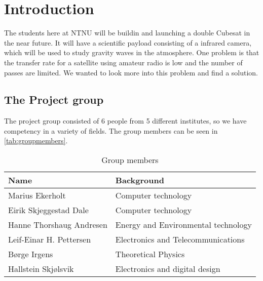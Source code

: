 \chapter{Introduction}
\label{chap:introduction}

The students here at NTNU will be buildin and launching a double Cubesat in the near future. It will have a scientific payload consisting of a infrared camera, which will be used to study gravity waves in the atmosphere. One problem is that the transfer rate for a satellite using amateur radio is low and the number of passes are limited. We wanted to look more into this problem and find a solution.




\section{The Project group}
The project group consisted of 6 people from 5 different institutes, so we have competency in a variety of fields. The group members can be seen in \autoref{tab:groupmembers}.

\begin{table}
	\begin{center}
		\begin{tabular}{|l|l|}   
			\hline      
			\bf{Name} & \bf{Background} \\ 
			\hline
			Marius Ekerholt & Computer technology\\     
			\hline
			Eirik Skjeggestad Dale & Computer technology\\     
			\hline
			Hanne Thorshaug Andresen & Energy and Environmental technology\\     
			\hline
			Leif-Einar H. Pettersen & Electronics and Telecommunications\\     
			\hline
			Børge Irgens & Theoretical Physics\\     
			\hline
			Hallstein Skjølsvik & Electronics and digital design\\     
			\hline
		 \end{tabular}
	\end{center}
	\caption{Group members}
	\label{tab:groupmembers}
\end{table}
